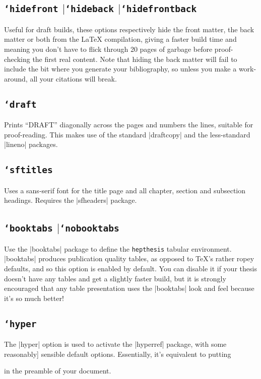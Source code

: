 \documentclass[12pt]{article}
\newcommand{\hepthesis}{\texttt{hepthesis}\xspace}
\newcommand{\Or}{\ensuremath{\vert}\xspace}
\newcommand{\texopt}[1]{\texttt{\char`#1}}
\newcommand{\texoption}[1]{\texopt{#1}}
\newenvironment{snippet}{\Verbatim}{\endVerbatim}
\begin{document}
\subsection{\texoption{hidefront} \Or \texoption{hideback} \Or \texoption{hidefrontback}}
Useful for draft builds, these options respectively hide the front matter, the
back matter or both from the \LaTeX{} compilation, giving a faster build time
and meaning you don't have to flick through 20 pages of garbage before
proof-checking the first real content. Note that hiding the back matter will
fail to include the bit where you generate your bibliography, so unless you make
a work-around, all your citations will break.

\subsection{\texoption{draft}}
Prints ``DRAFT'' diagonally across the pages and numbers the lines, suitable for
proof-reading. This makes use of the standard |draftcopy| and the less-standard
|lineno| packages.

\subsection{\texoption{sftitles}}
Uses a sans-serif font for the title page and all chapter, section and
subsection headings. Requires the |sfheaders| package.

\subsection{\texoption{booktabs} \Or \texoption{nobooktabs}}
Use the |booktabs| package to define the \hepthesis tabular environment.
|booktabs| produces publication quality tables, as opposed to \TeX's rather
ropey defaults, and so this option is enabled by default. You can disable it if
your thesis doesn't have any tables and get a slightly faster build, but it is
strongly encouraged that any table presentation uses the |booktabs| look and
feel because it's so much better!

\subsection{\texoption{hyper}}
The |hyper| option is used to activate the |hyperref| package, with some reasonably]
sensible default options. Essentially, it's equivalent to putting
%
\begin{snippet}
\usepackage[colorlinks=true,pdfpagemode=FullScreen, \
            bookmarks=true]{hyperref}
\end{snippet}
%
in the preamble of your document.
\end{document}
